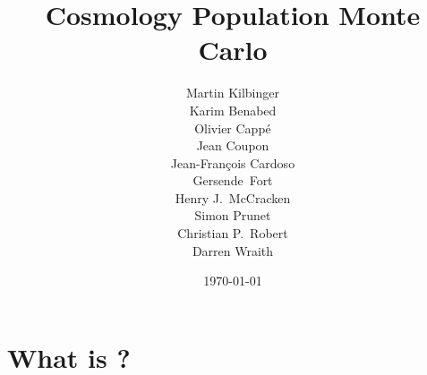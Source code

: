 \documentclass[11pt, chapterprefix, headsepline]{scrartcl}
\newcommand{\mysubtitle}[1]{\renewcommand{\TexiSubTitle}{#1}}
\begin{document}




\setcounter{page}{0}

\title{Cosmology Population Monte Carlo}
\mysubtitle{\CosmoPMC\ v\CosmoPMCVersion\ \hfill User's manual}

\subject{The cookbook}
\author{%
  \parbox{\textwidth}{
    Martin Kilbinger\\
    Karim Benabed\\
    Olivier Capp\'e\\
    Jean Coupon\\
    Jean-Fran\c{c}ois Cardoso\\
    Gersende~Fort\\
    Henry J.~McCracken\\
    Simon Prunet\\
    Christian P.~Robert\\
    Darren Wraith
}
}
\date{\today}
\maketitle
\newpage


\setcounter{tocdepth}{2}
\setcounter{page}{0}
\tableofcontents
\setcounter{page}{0}
\newpage
\setcounter{page}{1}


\pagestyle{headings}


\section{What is \CosmoPMC?}
\end{document}
